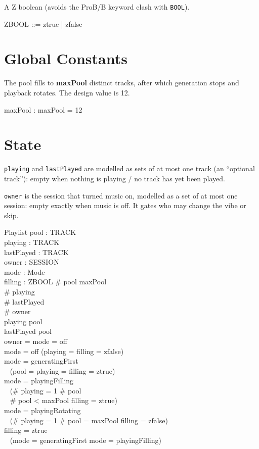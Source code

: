 \documentclass[a4paper,10pt,fleqn]{article}
\begin{document}
A Z boolean (avoids the ProB/B keyword clash with \texttt{BOOL}).

\begin{zed}
  ZBOOL ::= ztrue | zfalse
\end{zed}

\section{Global Constants}

The pool fills to \textbf{maxPool} distinct tracks, after which
generation stops and playback rotates. The design value is 12.

\begin{axdef}
  maxPool : \nat
  \where
  maxPool = 12
\end{axdef}

\section{State}

\texttt{playing} and \texttt{lastPlayed} are modelled as sets of at most
one track (an ``optional track''): empty when nothing is playing / no
track has yet been played.

\texttt{owner} is the session that turned music on, modelled as a set of at
most one session: empty exactly when music is off. It gates who may change
the vibe or skip.

\begin{schema}{Playlist}
  pool : \power TRACK \\
  playing : \power TRACK \\
  lastPlayed : \power TRACK \\
  owner : \power SESSION \\
  mode : Mode \\
  filling : ZBOOL
  \where
  \# pool \leq maxPool \\
  \# playing  \\
  \# lastPlayed  \\
  \# owner  \\
  playing \subseteq pool \\
  lastPlayed \subseteq pool \\
  owner = \emptyset \iff mode = off \\
  mode = off \implies (playing = \emptyset \land filling = zfalse) \\
  mode = generatingFirst \implies \\
  \quad~ (pool = \emptyset \land playing = \emptyset \land filling = ztrue) \\
  mode = playingFilling \implies \\
  \quad~ (\# playing = 1 \land \# pool  \\
  \quad~ \land \# pool < maxPool \land filling = ztrue) \\
  mode = playingRotating \implies \\
  \quad~ (\# playing = 1 \land \# pool = maxPool \land filling = zfalse) \\
  filling = ztrue \implies \\
  \quad~ (mode = generatingFirst \lor mode = playingFilling)
\end{schema}
\end{document}
